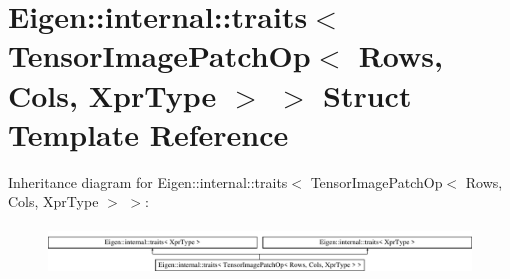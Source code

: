 \hypertarget{struct_eigen_1_1internal_1_1traits_3_01_tensor_image_patch_op_3_01_rows_00_01_cols_00_01_xpr_type_01_4_01_4}{}\section{Eigen\+:\+:internal\+:\+:traits$<$ Tensor\+Image\+Patch\+Op$<$ Rows, Cols, Xpr\+Type $>$ $>$ Struct Template Reference}
\label{struct_eigen_1_1internal_1_1traits_3_01_tensor_image_patch_op_3_01_rows_00_01_cols_00_01_xpr_type_01_4_01_4}
Inheritance diagram for Eigen\+:\+:internal\+:\+:traits$<$ Tensor\+Image\+Patch\+Op$<$ Rows, Cols, Xpr\+Type $>$ $>$\+:\begin{figure}[H]
\begin{center}
\leavevmode
\includegraphics[height=1.320755cm]{struct_eigen_1_1internal_1_1traits_3_01_tensor_image_patch_op_3_01_rows_00_01_cols_00_01_xpr_type_01_4_01_4}
\end{center}
\end{figure}
